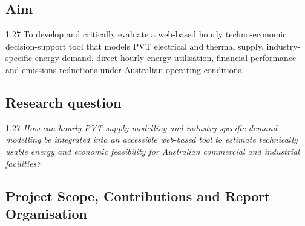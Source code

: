 \documentclass[12pt,letterpaper]{article}
\newcommand{\done}{\ \textcolor{green!45!black}{$\checkmark$}} %
\begin{document}
\subsection[Aim\done]{Aim}\label{sec4}

\begin{spacing}{1.27}
To develop and critically evaluate a web-based hourly techno-economic decision-support tool that models PVT electrical and thermal supply, industry-specific energy demand, direct hourly energy utilisation, financial performance and emissions reductions under Australian operating conditions.
\end{spacing}

\subsection[Research question\done]{Research question}\label{sec5}

\begin{spacing}{1.27}
\textit{How can hourly PVT supply modelling and industry-specific demand modelling be integrated into an accessible web-based tool to estimate technically usable energy and economic feasibility for Australian commercial and industrial facilities?}
\end{spacing}

\subsection[Project Scope, Contributions and Report Organisation\done]{Project Scope, Contributions and Report Organisation}\label{sec6}
\end{document}
